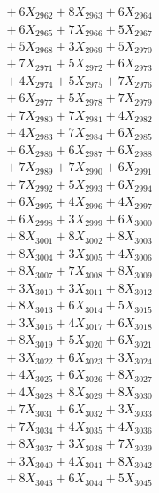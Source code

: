 \documentclass[a4paper,10pt]{article}
\begin{document}
{\begin{align}
&\;  + 6 X_{2962} + 8 X_{2963} + 6 X_{2964} \\[0.3ex]
&\;  + 6 X_{2965} + 7 X_{2966} + 5 X_{2967} \\[0.3ex]
&\;  + 5 X_{2968} + 3 X_{2969} + 5 X_{2970} \\[0.3ex]
&\;  + 7 X_{2971} + 5 X_{2972} + 6 X_{2973} \\[0.3ex]
&\;  + 4 X_{2974} + 5 X_{2975} + 7 X_{2976} \\[0.3ex]
&\;  + 6 X_{2977} + 5 X_{2978} + 7 X_{2979} \\[0.5ex]\allowbreak
&\;  + 7 X_{2980} + 7 X_{2981} + 4 X_{2982} \\[0.3ex]
&\;  + 4 X_{2983} + 7 X_{2984} + 6 X_{2985} \\[0.3ex]
&\;  + 6 X_{2986} + 6 X_{2987} + 6 X_{2988} \\[0.3ex]
&\;  + 7 X_{2989} + 7 X_{2990} + 6 X_{2991} \\[0.3ex]
&\;  + 7 X_{2992} + 5 X_{2993} + 6 X_{2994} \\[0.3ex]
&\;  + 6 X_{2995} + 4 X_{2996} + 4 X_{2997} \\[0.3ex]
&\;  + 6 X_{2998} + 3 X_{2999} + 6 X_{3000} \\[0.3ex]
&\;  + 8 X_{3001} + 8 X_{3002} + 8 X_{3003} \\[0.3ex]
&\;  + 8 X_{3004} + 3 X_{3005} + 4 X_{3006} \\[0.3ex]
&\;  + 8 X_{3007} + 7 X_{3008} + 8 X_{3009} \\[0.5ex]\allowbreak
&\;  + 3 X_{3010} + 3 X_{3011} + 8 X_{3012} \\[0.3ex]
&\;  + 8 X_{3013} + 6 X_{3014} + 5 X_{3015} \\[0.3ex]
&\;  + 3 X_{3016} + 4 X_{3017} + 6 X_{3018} \\[0.3ex]
&\;  + 8 X_{3019} + 5 X_{3020} + 6 X_{3021} \\[0.3ex]
&\;  + 3 X_{3022} + 6 X_{3023} + 3 X_{3024} \\[0.3ex]
&\;  + 4 X_{3025} + 6 X_{3026} + 8 X_{3027} \\[0.3ex]
&\;  + 4 X_{3028} + 8 X_{3029} + 8 X_{3030} \\[0.3ex]
&\;  + 7 X_{3031} + 6 X_{3032} + 3 X_{3033} \\[0.3ex]
&\;  + 7 X_{3034} + 4 X_{3035} + 4 X_{3036} \\[0.3ex]
&\;  + 8 X_{3037} + 3 X_{3038} + 7 X_{3039} \\[0.5ex]\allowbreak
&\;  + 3 X_{3040} + 4 X_{3041} + 8 X_{3042} \\[0.3ex]
&\;  + 8 X_{3043} + 6 X_{3044} + 5 X_{3045} \\[0.3ex]

\end{align}}
\end{document}
